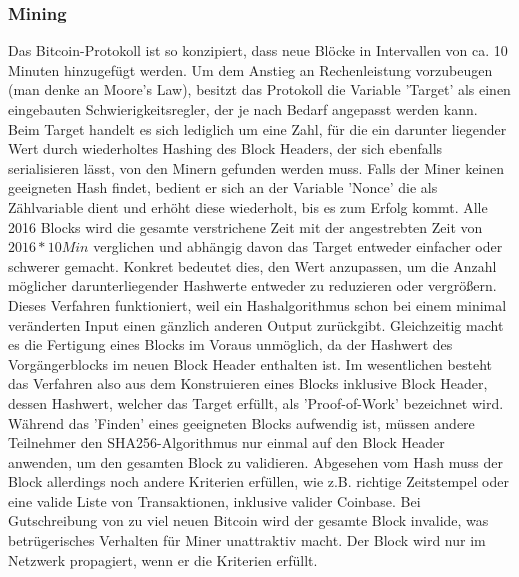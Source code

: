 \subsubsection{Mining}
Das Bitcoin-Protokoll ist so konzipiert, dass neue Blöcke in Intervallen von ca. 10 Minuten hinzugefügt werden. 
Um dem Anstieg an Rechenleistung vorzubeugen (man denke an Moore's Law), besitzt das Protokoll die Variable 'Target' als einen eingebauten Schwierigkeitsregler, der je nach Bedarf angepasst werden kann.
Beim Target handelt es sich lediglich um eine Zahl, für die ein darunter liegender Wert durch wiederholtes Hashing des Block Headers, der sich ebenfalls serialisieren lässt, von den Minern gefunden werden muss. 
Falls der Miner keinen geeigneten Hash findet, bedient er sich an der Variable 'Nonce' die als Zählvariable dient und erhöht diese wiederholt, bis es zum Erfolg kommt.
Alle 2016 Blocks wird die gesamte verstrichene Zeit mit der angestrebten Zeit von $2016 * 10 Min$ verglichen und abhängig davon das Target entweder einfacher oder schwerer gemacht. 
Konkret bedeutet dies, den Wert anzupassen, um die Anzahl möglicher darunterliegender Hashwerte entweder zu reduzieren oder vergrößern.
Dieses Verfahren funktioniert, weil ein Hashalgorithmus schon bei einem minimal veränderten Input einen gänzlich anderen Output zurückgibt. 
Gleichzeitig macht es die Fertigung eines Blocks im Voraus unmöglich, da der Hashwert des Vorgängerblocks im neuen Block Header enthalten ist. 
Im wesentlichen besteht das Verfahren also aus dem Konstruieren eines Blocks inklusive Block Header, dessen Hashwert, welcher das Target erfüllt, als 'Proof-of-Work' bezeichnet wird.\\

Während das 'Finden' eines geeigneten Blocks aufwendig ist, müssen andere Teilnehmer den SHA256-Algorithmus nur einmal auf den Block Header anwenden, um den gesamten Block zu validieren. 
Abgesehen vom Hash muss der Block allerdings noch andere Kriterien erfüllen, wie z.B. richtige Zeitstempel oder eine valide Liste von Transaktionen, inklusive valider Coinbase. 
Bei Gutschreibung von zu viel neuen Bitcoin wird der gesamte Block invalide, was betrügerisches Verhalten für Miner unattraktiv macht. Der Block wird nur im Netzwerk propagiert, wenn er die Kriterien erfüllt.\\

